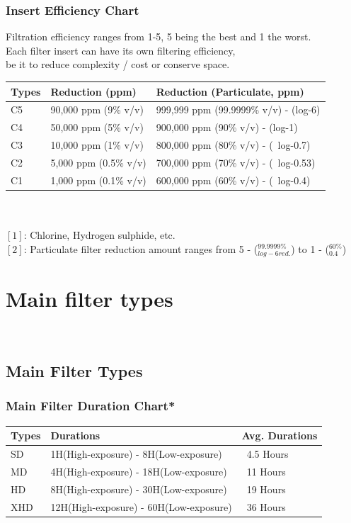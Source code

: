 \documentclass[a4paper, 12pt, oneside]{article}
\begin{document}
{			\subsubsection{Insert Efficiency Chart}
				Filtration efficiency ranges from 1-5, 5 being the best and 1 the worst. \\
				Each filter insert can have its own filtering efficiency, \\
				be it to reduce complexity / cost or conserve space.
				\begin{tabular}{|p{1cm}||p{4cm}|p{7.57cm}|}
					\hline
					Types & Reduction (ppm) & Reduction (Particulate, ppm) \\\hline
					C5 & 90,000 ppm (9\% v/v) & 999,999 ppm (99.9999\% v/v) - (log-6) \\
					C4 & 50,000 ppm (5\% v/v) & 900,000 ppm (90\% v/v) - (log-1) \\
					C3 & 10,000 ppm (1\% v/v) & 800,000 ppm (80\% v/v) - (~log-0.7) \\
					C2 & 5,000  ppm (0.5\% v/v) & 700,000 ppm (70\% v/v) - (~log-0.53) \\
					C1 & 1,000  ppm (0.1\% v/v) & 600,000 ppm (60\% v/v) - (~log-0.4) 	\\\hline
				\end{tabular} \\ \- \\
				$[1]$: Chlorine, Hydrogen sulphide, etc. \\
				$[2]$: Particulate filter reduction amount ranges from
				 5 - ($^{99.9999\%}_{log-6red.}$) to 1 - ($^{60\%}_{0.4}$)
			
	\newpage
			
	\section{Main filter types} \-\\
		\subsection{Main Filter Types}
			\subsubsection{Main Filter Duration Chart*}
				\begin{tabular}{|p{1cm}||p{8.44cm}|p{3cm}|}
					\hline
					Types & Durations & Avg. Durations \\\hline
					SD & 1H(High-exposure) - 8H(Low-exposure) &  ~4.5 Hours\\
					MD & 4H(High-exposure) - 18H(Low-exposure) & ~11 Hours \\
					HD & 8H(High-exposure) - 30H(Low-exposure) & ~19 Hours \\
					XHD & 12H(High-exposure) - 60H(Low-exposure) & ~36 Hours \\\hline
				\end{tabular} \\ \-\\
}
\end{document}
